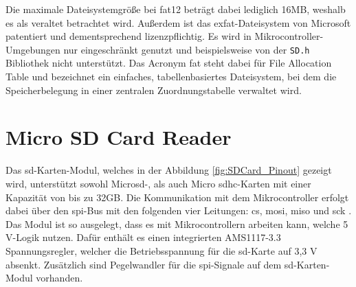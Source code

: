 Die maximale Dateisystemgröße bei \acs{fat}12 beträgt dabei lediglich 16MB, weshalb es als veraltet betrachtet wird. Außerdem ist das ex\acs{fat}-Dateisystem von Microsoft patentiert und dementsprechend lizenzpflichtig. Es wird in Mikrocontroller-Umgebungen nur eingeschränkt genutzt und beispielsweise von der \texttt{SD.h} Bibliothek nicht unterstützt. Das Acronym \acs{fat} steht dabei für File Allocation Table und bezeichnet ein einfaches, tabellenbasiertes Dateisystem, bei dem die Speicherbelegung in einer zentralen Zuordnungstabelle verwaltet wird. \cite{baun_operating_2023}


\section{Micro SD Card Reader}

Das \ac{sd}-Karten-Modul, welches in der Abbildung \ref{fig:SDCard_Pinout} gezeigt wird, unterstützt sowohl Micro\ac{sd}-, als auch Micro \ac{sdhc}-Karten mit einer Kapazität von bis zu 32GB. Die Kommunikation mit dem Mikrocontroller erfolgt dabei über den \acs{spi}-Bus mit den folgenden vier Leitungen: \ac{cs}, \ac{mosi}, \ac{miso} und \ac{sck} \cite{veeramanikandasamy_microcontroller_2016}. Das Modul ist so ausgelegt, dass es mit Mikrocontrollern arbeiten kann, welche 5 V-Logik nutzen. Dafür enthält es einen integrierten AMS1117-3.3 Spannungsregler, welcher die Betriebsspannung für die \acs{sd}-Karte auf 3,3 V absenkt. Zusätzlich sind Pegelwandler für die \acs{spi}-Signale auf dem \acs{sd}-Karten-Modul vorhanden.  \cite{az-delivery_vertriebs_gmbh_sd-karten-modul_2015} \cite{roboter-bausatzde_micro_2025}\\

